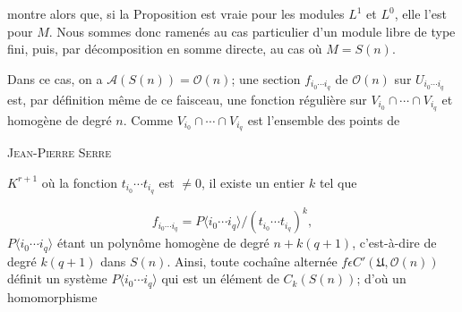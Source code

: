 \begin{center}
\end{center}
montre alors que, si la Proposition est vraie pour les modules $L^1$ et $L^0$, elle l'est pour $M$. Nous sommes donc ramenés au cas particulier d'un module libre de type fini, puis, par décomposition en somme directe, au cas où $M = S(n)$.

Dans ce cas, on a $\mathcal{A}(S(n)) = \mathcal{O}(n)$; une section $f_{i_0 \cdots i_q}$ de $\mathcal{O}(n)$ sur $U_{i_0 \cdots i_q}$ est, par définition même de ce faisceau, une fonction régulière sur $V_{i_0} \cap \cdots \cap V_{i_q}$ et homogène de degré $n$. Comme $V_{i_0} \cap \cdots \cap V_{i_q}$ est l'ensemble des points de 




\textsc{Jean-Pierre Serre}

 $K^{r+1}$ où la fonction $t_{i_0} \cdots t_{i_q}$ est $\neq 0$, il existe un entier $k$ tel que

\begin{equation*}
f_{i_0 \cdots i_q} = P\langle i_0 \cdots i_q\rangle/(t_{i_0} \cdots t_{i_q})^k,
\end{equation*}
$P\langle i_0 \cdots i_q\rangle$ étant un polynôme homogène de degré $n + k(q + 1)$, c'est-à-dire de degré $k(q + 1)$ dans $S(n)$. Ainsi, toute cochaîne alternée $f \epsilon C'(\mathfrak{U}, \mathcal{O}(n))$ définit un système $P\langle i_0 \cdots i_q\rangle$ qui est un élément de $C_k(S(n))$; d'où un homomorphisme

